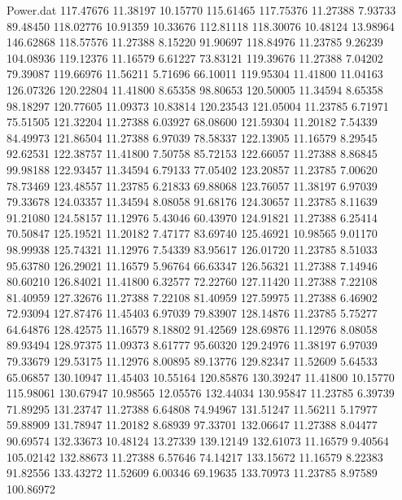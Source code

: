 \begin{filecontents}{Power.dat}
 117.47676   11.38197   10.15770  115.61465
 117.75376   11.27388    7.93733   89.48450
 118.02776   10.91359   10.33676  112.81118
 118.30076   10.48124   13.98964  146.62868
 118.57576   11.27388    8.15220   91.90697
 118.84976   11.23785    9.26239  104.08936
 119.12376   11.16579    6.61227   73.83121
 119.39676   11.27388    7.04202   79.39087
 119.66976   11.56211    5.71696   66.10011
 119.95304   11.41800   11.04163  126.07326
 120.22804   11.41800    8.65358   98.80653
 120.50005   11.34594    8.65358   98.18297
 120.77605   11.09373   10.83814  120.23543
 121.05004   11.23785    6.71971   75.51505
 121.32204   11.27388    6.03927   68.08600
 121.59304   11.20182    7.54339   84.49973
 121.86504   11.27388    6.97039   78.58337
 122.13905   11.16579    8.29545   92.62531
 122.38757   11.41800    7.50758   85.72153
 122.66057   11.27388    8.86845   99.98188
 122.93457   11.34594    6.79133   77.05402
 123.20857   11.23785    7.00620   78.73469
 123.48557   11.23785    6.21833   69.88068
 123.76057   11.38197    6.97039   79.33678
 124.03357   11.34594    8.08058   91.68176
 124.30657   11.23785    8.11639   91.21080
 124.58157   11.12976    5.43046   60.43970
 124.91821   11.27388    6.25414   70.50847
 125.19521   11.20182    7.47177   83.69740
 125.46921   10.98565    9.01170   98.99938
 125.74321   11.12976    7.54339   83.95617
 126.01720   11.23785    8.51033   95.63780
 126.29021   11.16579    5.96764   66.63347
 126.56321   11.27388    7.14946   80.60210
 126.84021   11.41800    6.32577   72.22760
 127.11420   11.27388    7.22108   81.40959
 127.32676   11.27388    7.22108   81.40959
 127.59975   11.27388    6.46902   72.93094
 127.87476   11.45403    6.97039   79.83907
 128.14876   11.23785    5.75277   64.64876
 128.42575   11.16579    8.18802   91.42569
 128.69876   11.12976    8.08058   89.93494
 128.97375   11.09373    8.61777   95.60320
 129.24976   11.38197    6.97039   79.33679
 129.53175   11.12976    8.00895   89.13776
 129.82347   11.52609    5.64533   65.06857
 130.10947   11.45403   10.55164  120.85876
 130.39247   11.41800   10.15770  115.98061
 130.67947   10.98565   12.05576  132.44034
 130.95847   11.23785    6.39739   71.89295
 131.23747   11.27388    6.64808   74.94967
 131.51247   11.56211    5.17977   59.88909
 131.78947   11.20182    8.68939   97.33701
 132.06647   11.27388    8.04477   90.69574
 132.33673   10.48124   13.27339  139.12149
 132.61073   11.16579    9.40564  105.02142
 132.88673   11.27388    6.57646   74.14217
 133.15672   11.16579    8.22383   91.82556
 133.43272   11.52609    6.00346   69.19635
 133.70973   11.23785    8.97589  100.86972

\end{filecontents}
